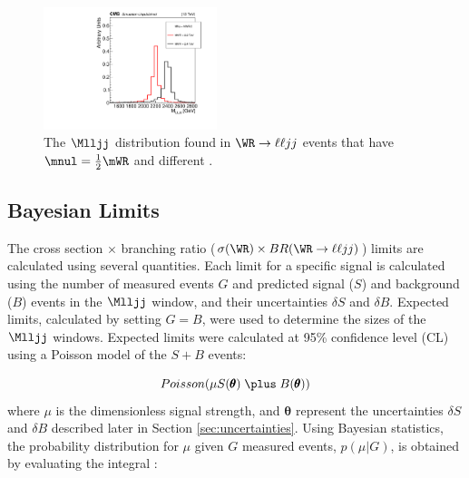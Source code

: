\begin{figure}[h]
	\centering
	\includegraphics[width=0.45\textwidth]{figures/massGenFstHvyPtcl_several_MWR_and_MNu_private.pdf}
	\caption{The $\Mlljj$ distribution found in $\WR \rightarrow \ell\ell jj$ events that have $\mnul = \frac{1}{2}\mWR$ 
		and different \mWR.}
	\label{fig:mWrShapeVsMWr}
\end{figure}
\clearpage

\subsection{Bayesian Limits}
\label{sec:bayesianStatsAndLimits}
The \WR cross section $\times$ branching ratio ($\sigma(\WR) \times BR(\WR \rightarrow \ell\ell jj)$) limits are calculated 
using several quantities.  Each limit for a specific \mWR signal is calculated using the number of measured events $G$ and 
predicted signal ($S$) and background ($B$) events in the $\Mlljj$ window, and their uncertainties $\delta S$ and $\delta B$.  
Expected limits, calculated by setting $G = B$, were used to determine the sizes of the $\Mlljj$ windows.  Expected limits were 
calculated at 95\% confidence level (CL) using a Poisson model of the $S \plus B$ events:

\begin{equation}
	Poisson(\mu S(\pmb{\theta}) \thickspace \plus \thickspace B(\pmb{\theta}))
	\label{eq:poissonModel}
\end{equation}
where $\mu$ is the dimensionless \WR signal strength, and $\pmb{\theta}$ represent the uncertainties $\delta S$ and $\delta B$ 
described later in Section \ref{sec:uncertainties}.  Using Bayesian statistics, the probability distribution for $\mu$ given 
$G$ measured events, $p(\mu|G)$, is obtained by evaluating the integral \cite{bayesianDataAnalysis}:

